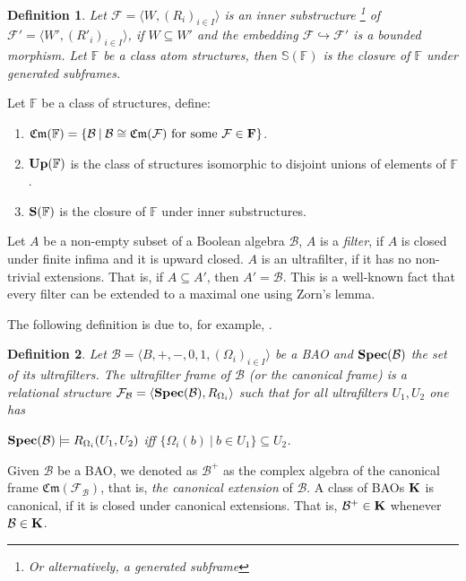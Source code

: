 \documentclass[a4paper]{article}
\theoremstyle{defin}
\newtheorem{defin}{Definition}
\theoremstyle{theorem}
\theoremstyle{prop}
\theoremstyle{lemma}
\theoremstyle{fact}
\theoremstyle{ex}
\theoremstyle{col}
\begin{document}
\begin{defin} Let $\mathcal{F} = \langle W, (R_{i})_{i \in I} \rangle$ is an inner substructure \footnote{Or alternatively, a generated subframe} of $\mathcal{F}' = \langle W', ({R'}_{i})_{i \in I} \rangle$, if $W \subseteq W'$ and the embedding $\mathcal{F} \hookrightarrow \mathcal{F}'$ is a bounded morphism. Let $\mathbb{F}$ be a class atom structures, then $\mathbb{S}(\mathbb{F})$ is the closure of $\mathbb{F}$ under generated subframes.
\end{defin}

Let $\mathbb{F}$ be a class of structures, define:
\begin{enumerate}
\item $\mathfrak{Cm}(\mathbb{F}) = \{ \mathcal{B} \: | \: \mathcal{B} \cong \mathfrak{Cm}(\mathcal{F}) \text{ for some $\mathcal{F} \in {\bf F}$}\}$.
\item ${\bf Up}(\mathbb{F})$ is the class of structures isomorphic to disjoint unions of elements of $\mathbb{F}$.
\item ${\bf S}(\mathbb{F})$ is the closure of $\mathbb{F}$ under inner substructures.
\end{enumerate}

Let $A$ be a non-empty subset of a Boolean algebra $\mathcal{B}$, $A$ is a \emph{filter}, if $A$ is closed under finite infima and it is upward closed. $A$ is an ultrafilter, if it has no non-trivial extensions. That is, if $A \subseteq A'$, then $A' = \mathcal{B}$. This is a well-known fact that every filter can be extended to a maximal one using Zorn's lemma.

The following definition is due to, for example, \cite[Definition 5.40]{venema2010}.

\begin{defin}
  Let $\mathcal{B} = \langle B, +, -, 0, 1, (\Omega_i)_{i \in I} \rangle$ be a BAO and ${\bf Spec}(\mathcal{B})$ the set of its ultrafilters. The ultrafilter frame of $\mathcal{B}$ (or the canonical frame) is a relational structure $\mathcal{F}_{\mathcal{B}} = \langle {\bf Spec}(\mathcal{B}), R_{\Omega_i} \rangle$ such that for all ultrafilters $U_1, U_2$ one has
  \begin{center}
    ${\bf Spec}(\mathcal{B}) \models R_{\Omega_i}(U_1, U_2)$ iff $\{ \Omega_i(b) \: | \: b \in U_1 \} \subseteq U_2$.
  \end{center}
\end{defin}

Given $\mathcal{B}$ be a BAO, we denoted as $\mathcal{B}^{+}$ as the complex algebra of the canonical frame $\mathfrak{Cm}(\mathcal{F}_{\mathcal{B}})$, that is, \emph{the canonical extension} of $\mathcal{B}$.
A class of BAOs ${\bf K}$ is canonical, if it is closed under canonical extensions. That is, $\mathcal{B}^{+} \in {\bf K}$ whenever $\mathcal{B} \in {\bf K}$.
\end{document}
